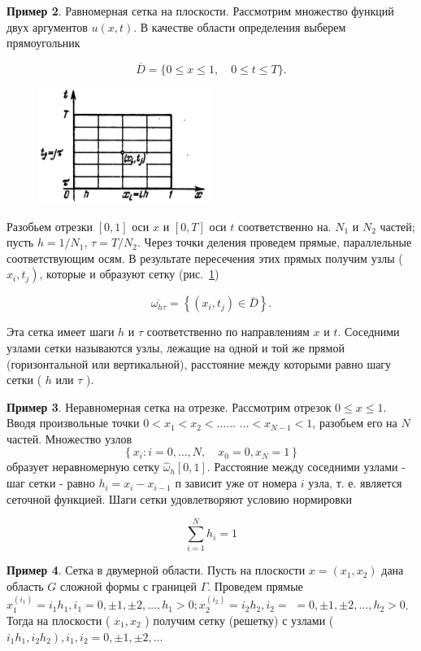 \textbf{Пример 2}. Равномерная сетка на плоскости. Рассмотрим множество функций двух аргументов $u(x, t)$. В качестве области определения выберем прямоугольник

$$
\overline{D}=\{0 \leqslant x \leqslant 1, \quad 0 \leqslant t \leqslant T\} .
$$

\begin{figure}
	\centering
	\includegraphics[width=0.5\textwidth]{img/2.png}
	\caption{}
	\label{fig:2}
\end{figure}


Разобьем отрезки $[0,1]$ оси $x$ и $[0, T]$ оси $t$ соответственно на. $N_1$ и $N_2$ частей; пусть $h=1 / N_1$, $\tau=T / N_2$. Через точки деления проведем прямые, параллельные соответствующим осям. В результате пересечения этих прямых получим узлы ( $\left.x_i, t_j\right)$, которые и образуют сетку (рис.~\ref{fig:2}) 

$$
\overline{\omega_{h \tau}}=\left\{\left(x_i, t_j\right) \in \overline{D}\right\} .
$$

Эта сетка имеет шаги $h$ и $\tau$ соответственно по направлениям $x$ и $t$. Соседними узлами сетки называются узлы, лежащие на одной и той же прямой (горизонтальной или вертикальной), расстояние между которыми равно шагу сетки ( $h$ или $\tau$ ).

\textbf{Пример 3}. Неравномерная сетка на отрезке. Рассмотрим отрезок $0 \leqslant x \leqslant 1$. Вводя произвольные точки $0<x_1<x_2<\ldots$... $\ldots<x_{N-1}<1$, разобьем его на $N$ частей. Множество узлов $$\left\{x_i : i=0, \ldots, N, \quad x_0=0, x_N=1\right\}$$ образует неравномерную сетку $\widehat{\omega}_h[0,1]$. Расстояние между соседними узлами - шаг сетки - равно $h_i=x_i-x_{i-1}$ п зависит уже от номера $i$ узла, т. е. является сеточной функцией. Шаги сетки удовлетворяют условию нормировки

$$
\sum_{i=1}^N h_i=1
$$

\textbf{Пример 4}. Сетка в двумерной области. Пусть на плоскости $x=\left(x_1, x_2\right)$ дана область $G$ сложной формы с границей $\Gamma$. Проведем прямые $x_1^{\left(i_1\right)}=i_1 h_1, i_1=0, \pm 1, \pm 2, \ldots, h_1>0 ; x_2^{\left(i_2\right)}=i_2 h_2, i_2=$ $=0, \pm 1, \pm 2, \ldots, h_2>0$. Тогда на плоскости ( $x_1, x_2$ ) получим сетку (решетку) с узлами ( $\left.i_1 h_1, i_2 h_2\right), i_1, i_2=0, \pm 1, \pm 2, \ldots$

